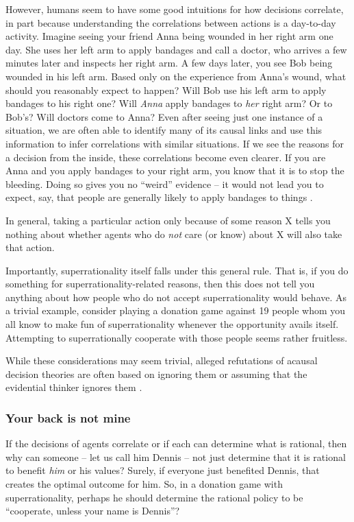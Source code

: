 However, humans seem to have some good intuitions for how decisions
correlate, in part because understanding the correlations between
actions is a day-to-day activity. Imagine seeing your friend Anna being
wounded in her right arm one day. She uses her left arm to apply
bandages and call a doctor, who arrives a few minutes later and inspects
her right arm. A few days later, you see Bob being wounded in his left
arm. Based only on the experience from Anna's wound, what should you
reasonably expect to happen? Will Bob use his left arm to apply bandages
to his right one? Will \emph{Anna} apply bandages to \emph{her} right
arm? Or to Bob's? Will doctors come to Anna? Even after seeing just one
instance of a situation, we are often able to identify many of its
causal links and use this information to infer correlations with similar
situations. If we see the reasons for a decision from the inside, these
correlations become even clearer. If you are Anna and you apply bandages
to your right arm, you know that it is to stop the bleeding. Doing so
gives you no ``weird'' evidence -- it would not lead you to expect, say,
that people are generally likely to apply bandages to things
\parencite{Ahmed2014-ec,Almond2010-xn}.

In general, taking a particular action only because of some reason X
tells you nothing about whether agents who do \emph{not} care (or know)
about X will also take that action.

Importantly, superrationality itself falls under this general rule. That
is, if you do something for superrationality-related reasons, then this
does not tell you anything about how people who do not accept
superrationality would behave. As a trivial example, consider playing a
donation game against 19 people whom you all know to make fun of
superrationality whenever the opportunity avails itself. Attempting to
superrationally cooperate with those people seems rather fruitless.

While these considerations may seem trivial, alleged refutations of
acausal decision theories are often based on ignoring them or assuming
that the evidential thinker ignores them
\parencite{Ahmed2014-ec,Almond2010-xn}.

\subsubsection{Your back is not mine}\label{your-back-is-not-mine}

If the decisions of agents correlate or if each can determine what is
rational, then why can someone -- let us call him Dennis -- not just
determine that it is rational to benefit \emph{him} or his values?
Surely, if everyone just benefited Dennis, that creates the optimal
outcome for him. So, in a donation game with superrationality, perhaps
he should determine the rational policy to be ``cooperate, unless your
name is Dennis''?

